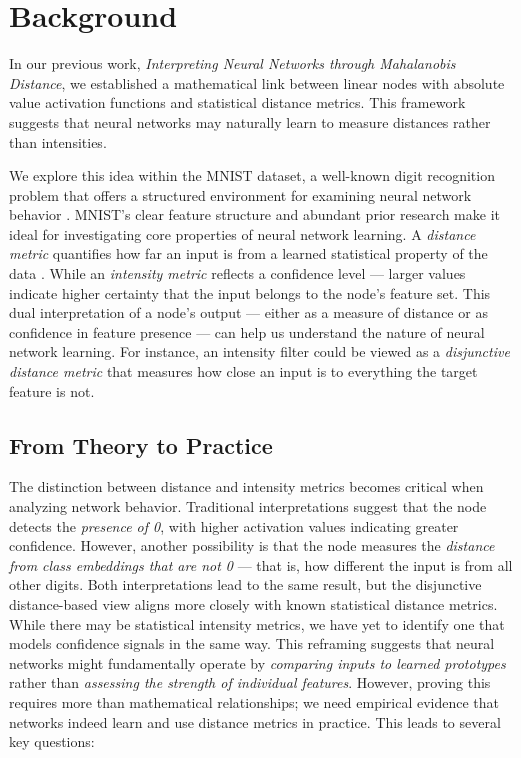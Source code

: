 \section{Background}

In our previous work, \textit{Interpreting Neural Networks through Mahalanobis Distance}, we established a mathematical link between linear nodes with absolute value activation functions and statistical distance metrics. \citep{oursland2024interpreting} This framework suggests that neural networks may naturally learn to measure distances rather than intensities.

We explore this idea within the MNIST dataset, a well-known digit recognition problem that offers a structured environment for examining neural network behavior \citep{lecun1998gradient}. MNIST's clear feature structure and abundant prior research make it ideal for investigating core properties of neural network learning.
A \emph{distance metric} quantifies how far an input is from a learned statistical property of the data \citep{deza2009encyclopedia}. While an \emph{intensity metric} reflects a confidence level — larger values indicate higher certainty that the input belongs to the node's feature set. This dual interpretation of a node's output — either as a measure of distance or as confidence in feature presence — can help us understand the nature of neural network learning. For instance, an intensity filter could be viewed as a \emph{disjunctive distance metric} that measures how close an input is to everything the target feature is not.

\subsection{From Theory to Practice}

The distinction between distance and intensity metrics becomes critical when analyzing network behavior. Traditional interpretations suggest that the node detects the \emph{presence of 0}, with higher activation values indicating greater confidence. However, another possibility is that the node measures the \emph{distance from class embeddings that are not 0} — that is, how different the input is from all other digits. Both interpretations lead to the same result, but the disjunctive distance-based view aligns more closely with known statistical distance metrics. While there may be statistical intensity metrics, we have yet to identify one that models confidence signals in the same way.
This reframing suggests that neural networks might fundamentally operate by \emph{comparing inputs to learned prototypes} rather than \emph{assessing the strength of individual features}. However, proving this requires more than mathematical relationships; we need empirical evidence that networks indeed learn and use distance metrics in practice. This leads to several key questions:

